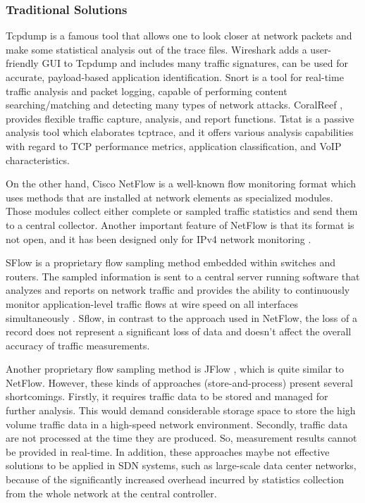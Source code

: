\subsubsection{Traditional Solutions}
Tcpdump \cite{tcpdump} is a famous tool that allows one to look closer at network packets and make some statistical analysis out of the trace files. Wireshark  \cite{wireshark} adds a user-friendly GUI to Tcpdump and includes many traffic signatures, can be used for accurate, payload-based application identification. Snort  \cite{Roesch_1999:Snort} is a tool for real-time traffic analysis and packet logging, capable of performing content searching/matching and detecting many types of network attacks.  CoralReef \cite{caida}, provides flexible traffic capture, analysis, and report functions. Tstat \cite{Finamore_2010:Tstat} is a passive analysis tool which elaborates tcptrace, and it offers various analysis capabilities with regard to TCP performance metrics, application classification, and VoIP characteristics. 

On the other hand, Cisco NetFlow is a well-known flow monitoring format which uses methods that are installed at network elements as specialized modules. Those modules collect either complete or sampled traffic statistics and send them to a central collector. Another important feature of NetFlow is that its format is not open, and it has been designed only for IPv4 network monitoring \cite{Cisco_2012:netflow}.

SFlow is a proprietary flow sampling method embedded within switches and routers. The sampled information is sent to a central server running software that analyzes and reports on network traffic and provides the ability to continuously monitor application-level traffic flows at wire speed on all interfaces simultaneously \cite{Sflow_2003:sflow}. Sflow, in contrast to the approach used in NetFlow,  the loss of a record does not represent a significant loss of data and doesn't affect the overall accuracy of traffic measurements. 

Another proprietary flow sampling method is JFlow \cite{bandi_2007:JFlow}, which is quite similar to NetFlow. However, these kinds of approaches (store-and-process) present several shortcomings. Firstly, it requires traffic data to be stored and managed for further analysis. This would demand considerable storage space to store the high volume traffic data in a high-speed network environment. Secondly, traffic data are not processed at the time they are produced. So, measurement results cannot be provided in real-time. In addition, these approaches maybe not effective solutions to be applied in SDN systems, such as large-scale data center networks, because of the significantly increased overhead incurred by statistics collection from the whole network at the central controller.


